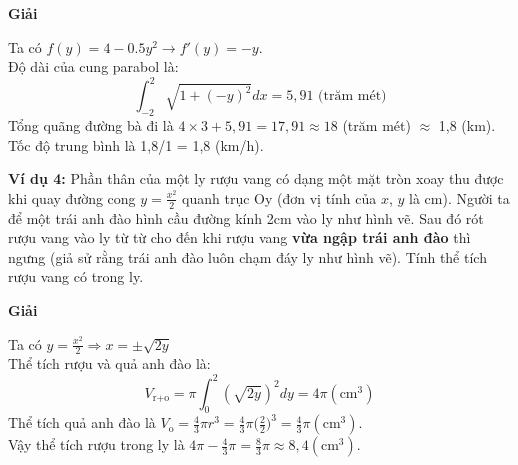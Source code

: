 \documentclass[13pt]{article}
\begin{document}
\begin{minipage}{7cm}
    \begin{center}
    \end{center}
\end{minipage}
\centerline{\textbf{Giải}}
Ta có $f(y)=4-0.5y^2\rightarrow f'(y)=-y$.\\
Độ dài của cung parabol là: $$\int_{-2}^2\sqrt{1+(-y)^2}dx=5,91\text{ (trăm mét)}$$
Tổng quãng đường bà đi là $4\times3+5,91=17,91\approx18$ (trăm mét) $\approx$ 1,8 (km).\\
Tốc độ trung bình là 1,8/1 = 1,8 (km/h).\\\newline
\begin{minipage}{7cm}
    \par\textbf{Ví dụ 4:} Phần thân của một ly rượu vang có dạng một mặt tròn xoay thu được khi quay đường cong $y=\frac{x^2}2$ quanh trục Oy (đơn vị tính của $x$, $y$ là cm). Người ta để một trái anh đào hình cầu đường kính 2cm vào ly như hình vẽ. Sau đó rót rượu vang vào ly từ từ cho đến khi rượu vang \textbf{vừa ngập trái anh đào} thì ngưng (giả sử rằng trái anh đào luôn chạm đáy ly như hình vẽ). Tính thể tích rượu vang có trong ly.
\end{minipage}
\begin{minipage}{7cm}
    \begin{center}
    \end{center}
\end{minipage}
\centerline{\textbf{Giải}}
Ta có $y=\frac{x^2}{2}\Rightarrow x=\pm\sqrt{2y}$\\
Thể tích rượu và quả anh đào là: $$V_{\text{r+o}}=\pi\int_0^2(\sqrt{2y})^2dy=4\pi(\text{cm}^3)$$
Thể tích quả anh đào là $V_\text{o}=\frac43\pi r^3=\frac{4}{3}\pi\bigg(\frac22\bigg)^3=\frac43\pi(\text{cm}^3)$.\\
Vậy thể tích rượu trong ly là $4\pi-\frac43\pi=\frac83\pi\approx8,4(\text{cm}^3)$.
\end{document}
